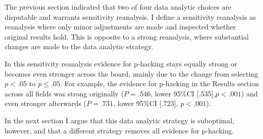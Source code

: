 The previous section indicated that two of four data analytic choices are disputable and warrants sensitivity reanalysis. I define a sensitivity reanalysis as reanalysis where only minor adjustments are made and inspected whether original results hold. This is opposite to a strong reanalysis, where substantial changes are made to the data analytic strategy.

In this sensitivity reanalysis evidence for p-hacking stays equally strong or becomes even stronger across the board, mainly due to the change from selecting $p<.05$ to $p\leq.05$. For example, the evidence for p-hacking in the Results section across all fields was strong originally ($P=.546$, lower 95\%CI [.535],$p<.001$) and even stronger afterwards ($P=.731$, lower 95\%CI [.723], $p<.001$).

In the next section I argue that this data analytic strategy is suboptimal, however, and that a different strategy removes all evidence for p-hacking.